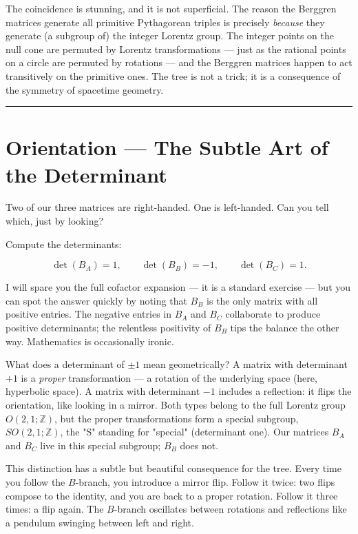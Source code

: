 \documentclass[11pt,openany]{book}
\theoremstyle{definition}
\theoremstyle{plain}
\theoremstyle{remark}
\begin{document}
The coincidence is stunning, and it is not superficial. The reason the Berggren matrices generate all primitive Pythagorean triples is precisely \textit{because} they generate (a subgroup of) the integer Lorentz group. The integer points on the null cone are permuted by Lorentz transformations — just as the rational points on a circle are permuted by rotations — and the Berggren matrices happen to act transitively on the primitive ones. The tree is not a trick; it is a consequence of the symmetry of spacetime geometry.

\bigskip\noindent\rule{\textwidth}{0.4pt}\bigskip


\section*{Orientation — The Subtle Art of the Determinant}


Two of our three matrices are right-handed. One is left-handed. Can you tell which, just by looking?

Compute the determinants:

$$\det(B_A) = 1, \qquad \det(B_B) = -1, \qquad \det(B_C) = 1.$$

I will spare you the full cofactor expansion — it is a standard exercise — but you can spot the answer quickly by noting that $B_B$ is the only matrix with all positive entries. The negative entries in $B_A$ and $B_C$ collaborate to produce positive determinants; the relentless positivity of $B_B$ tips the balance the other way. Mathematics is occasionally ironic.

What does a determinant of $\pm 1$ mean geometrically? A matrix with determinant $+1$ is a \textit{proper} transformation — a rotation of the underlying space (here, hyperbolic space). A matrix with determinant $-1$ includes a reflection: it flips the orientation, like looking in a mirror. Both types belong to the full Lorentz group $O(2, 1; \mathbb{Z})$, but the proper transformations form a special subgroup, $SO(2, 1; \mathbb{Z})$, the "S" standing for "special" (determinant one). Our matrices $B_A$ and $B_C$ live in this special subgroup; $B_B$ does not.

This distinction has a subtle but beautiful consequence for the tree. Every time you follow the $B$-branch, you introduce a mirror flip. Follow it twice: two flips compose to the identity, and you are back to a proper rotation. Follow it three times: a flip again. The $B$-branch oscillates between rotations and reflections like a pendulum swinging between left and right.
\end{document}
